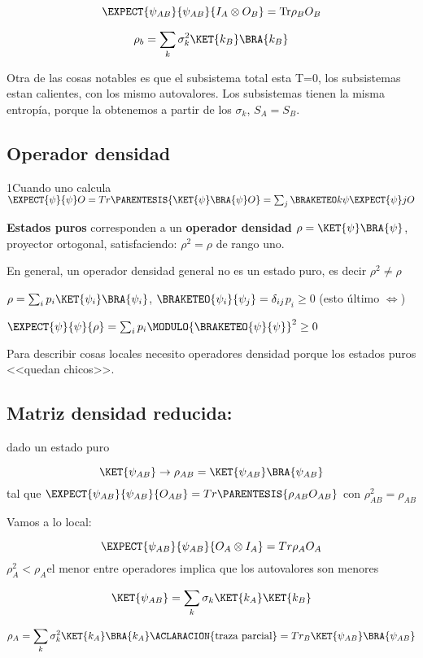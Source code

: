 \[
\EXPECT{\psi_{AB}}{\psi_{AB}}{I_{A}\otimes O_{B}}=\text{Tr}\rho_{B}O_{B}
\]

\[
\rho_{b}=\sum_{k}\sigma_{k}^{2}\KET{k_{B}}\BRA{k_{B}}
\]

Otra de las cosas notables es que el subsistema total esta T=0, los
subsistemas estan calientes, con los mismo autovalores. Los subsistemas
tienen la misma entropía, porque la obtenemos a partir de los $\sigma_{k}$,
$S_{A}=S_{B}$.

\subsection{Operador densidad}

1Cuando uno calcula $\EXPECT{\psi}{\psi}O=Tr\PARENTESIS{\KET{\psi}\BRA{\psi}O}=\sum_{j}\BRAKETEO k{\psi}\EXPECT{\psi}jO$ 

\textbf{Estados puros} corresponden a un \textbf{operador densidad
$\rho=\KET{\psi}\BRA{\psi}$}, proyector ortogonal, satisfaciendo:
$\rho^{2}=\rho$ de rango uno.

En general, un operador densidad general no es un estado puro, es decir
$\rho^{2}\neq\rho$

$\rho=\sum_{i}p_{i}\KET{\psi_{i}}\BRA{\psi_{i}}$, $\BRAKETEO{\psi_{i}}{\psi_{j}}=\delta_{ij}$$p_{i}\geq0$
(esto último $\iff$) 

$\EXPECT{\psi}{\psi}{\rho}=\sum_{i}p_{i}\MODULO{\BRAKETEO{\psi}{\psi}}^{2}\geq0$

Para describir cosas locales necesito operadores densidad porque los
estados puros <<quedan chicos>>. 

\subsection{Matriz densidad reducida: }

dado un estado puro

\[
\KET{\psi_{AB}}\rightarrow\rho_{AB}=\KET{\psi_{AB}}\BRA{\psi_{AB}}
\]
tal que $\EXPECT{\psi_{AB}}{\psi_{AB}}{O_{AB}}=Tr\PARENTESIS{\rho_{AB}O_{AB}}$
con $\rho_{AB}^{2}=\rho_{AB}$

Vamos a lo local:

\[
\EXPECT{\psi_{AB}}{\psi_{AB}}{O_{A}\otimes I_{A}}=Tr\rho_{A}O_{A}
\]
 $\rho_{A}^{2}<\rho_{A}$el menor entre operadores implica que los
autovalores son menores

\[
\KET{\psi_{AB}}=\sum_{k}\sigma_{k}\KET{k_{A}}\KET{k_{B}}
\]

\[
\rho_{A}=\sum_{k}\sigma_{k}^{2}\KET{k_{A}}\BRA{k_{A}}\ACLARACION{\text{traza parcial}}=Tr_{B}\KET{\psi_{AB}}\BRA{\psi_{AB}}
\]

